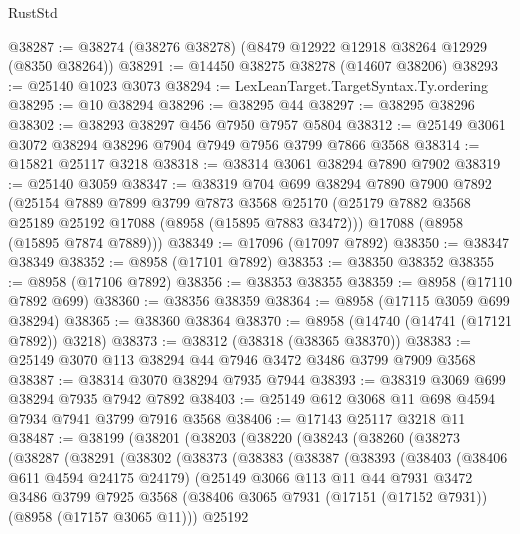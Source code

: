 \begin{lexlean}{RustStd}
\begin{coremodule}
@38287 := @38274 (@38276 @38278) (@8479 @12922 @12918 @38264 @12929 (@8350 @38264))
@38291 := @14450 @38275 @38278 (@14607 @38206)
@38293 := @25140 @1023 @3073
@38294 := LexLeanTarget.TargetSyntax.Ty.ordering
@38295 := @10 @38294
@38296 := @38295 @44
@38297 := @38295 @38296
@38302 := @38293 @38297 @456 @7950 @7957 @5804
@38312 := @25149 @3061 @3072 @38294 @38296 @7904 @7949 @7956 @3799 @7866 @3568
@38314 := @15821 @25117 @3218
@38318 := @38314 @3061 @38294 @7890 @7902
@38319 := @25140 @3059
@38347 := @38319
    @704
    @699
    @38294
    @7890
    @7900
    @7892
    (@25154
      @7889
      @7899
      @3799
      @7873
      @3568
      @25170
      (@25179 @7882 @3568 @25189 @25192 @17088 (@8958 (@15895 @7883 @3472)))
      @17088
      (@8958 (@15895 @7874 @7889)))
@38349 := @17096 (@17097 @7892)
@38350 := @38347 @38349
@38352 := @8958 (@17101 @7892)
@38353 := @38350 @38352
@38355 := @8958 (@17106 @7892)
@38356 := @38353 @38355
@38359 := @8958 (@17110 @7892 @699)
@38360 := @38356 @38359
@38364 := @8958 (@17115 @3059 @699 @38294)
@38365 := @38360 @38364
@38370 := @8958 (@14740 (@14741 (@17121 @7892)) @3218)
@38373 := @38312 (@38318 (@38365 @38370))
@38383 := @25149 @3070 @113 @38294 @44 @7946 @3472 @3486 @3799 @7909 @3568
@38387 := @38314 @3070 @38294 @7935 @7944
@38393 := @38319 @3069 @699 @38294 @7935 @7942 @7892
@38403 := @25149 @612 @3068 @11 @698 @4594 @7934 @7941 @3799 @7916 @3568
@38406 := @17143 @25117 @3218 @11
@38487 := @38199
    (@38201
      (@38203
        (@38220
          (@38243
            (@38260
              (@38273
                (@38287
                  (@38291
                    (@38302
                      (@38373
                        (@38383
                          (@38387
                            (@38393
                              (@38403
                                (@38406 @611 @4594 @24175 @24179)
                                (@25149
                                  @3066
                                  @113
                                  @11
                                  @44
                                  @7931
                                  @3472
                                  @3486
                                  @3799
                                  @7925
                                  @3568
                                  (@38406
                                    @3065
                                    @7931
                                    (@17151 (@17152 @7931))
                                    (@8958 (@17157 @3065 @11)))
                                  @25192

\end{coremodule}
\end{lexlean}
